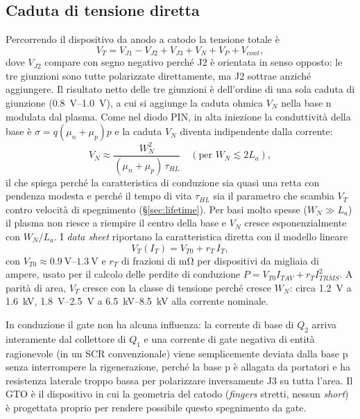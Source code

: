 \documentclass[11pt,a4paper]{article}
\newcommand{\en}[1]{\emph{#1}}   %
\begin{document}
\subsection{Caduta di tensione diretta}
Percorrendo il dispositivo da anodo a catodo la tensione totale è
\begin{equation}
  V_T = V_{J1} - V_{J2} + V_{J3} + V_{N} + V_{P} + V_{cont},
  \label{eq:VT}
\end{equation}
dove $V_{J2}$ compare con segno negativo perché J2 è orientata in senso opposto: le tre giunzioni sono tutte polarizzate direttamente, ma J2 sottrae anziché aggiungere. Il risultato netto delle tre giunzioni è dell'ordine di una sola caduta di giunzione (\qtyrange{0.8}{1.0}{\V}), a cui si aggiunge la caduta ohmica $V_N$ nella base n modulata dal plasma. Come nel diodo PIN, in alta iniezione la conduttività della base è $\sigma = q(\mu_n+\mu_p)p$ e la caduta $V_N$ diventa indipendente dalla corrente:
\begin{equation}
  V_N \approx \frac{W_N^2}{(\mu_n+\mu_p)\,\tau_{HL}}\quad(\text{per } W_N \lesssim 2L_a),
\end{equation}
il che spiega perché la caratteristica di conduzione sia quasi una retta con pendenza modesta e perché il tempo di vita $\tau_{HL}$ sia il parametro che scambia $V_T$ contro velocità di spegnimento (\S\ref{sec:lifetime}). Per basi molto spesse ($W_N\gg L_a$) il plasma non riesce a riempire il centro della base e $V_N$ cresce esponenzialmente con $W_N/L_a$. I \en{data sheet} riportano la caratteristica diretta con il modello lineare
\begin{equation}
  V_T(I_T) = V_{T0} + r_T\,I_T,
\end{equation}
con $V_{T0}\approx\qtyrange{0.9}{1.3}{\V}$ e $r_T$ di frazioni di \unit{\milli\ohm} per dispositivi da migliaia di ampere, usato per il calcolo delle perdite di conduzione $P = V_{T0}I_{TAV} + r_T I_{TRMS}^2$. A parità di area, $V_T$ cresce con la classe di tensione perché cresce $W_N$: circa \qty{1.2}{\V} a \qty{1.6}{\kV}, \qtyrange{1.8}{2.5}{\V} a \qtyrange{6.5}{8.5}{\kV} alla corrente nominale.

In conduzione il gate non ha alcuna influenza: la corrente di base di $Q_2$ arriva interamente dal collettore di $Q_1$ e una corrente di gate negativa di entità ragionevole (in un SCR convenzionale) viene semplicemente deviata dalla base p senza interrompere la rigenerazione, perché la base p è allagata da portatori e ha resistenza laterale troppo bassa per polarizzare inversamente J3 su tutta l'area. Il GTO è il dispositivo in cui la geometria del catodo (\en{fingers} stretti, nessun \en{short}) è progettata proprio per rendere possibile questo spegnimento da gate.
\end{document}
